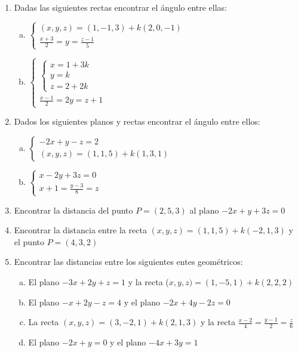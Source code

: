 \documentclass[11pt,a4paper]{article}
\begin{document}
\begin{enumerate}
\item Dadas las siguientes rectas encontrar el \'angulo entre ellas:

\begin{enumerate}[a)]
\item $\begin{cases}
  (x, y, z) = (1, -1, 3) + k (2, 0, -1) \\
  \frac{x + 3}{2} = y = \frac{z - 1}{5} 
\end{cases}$
\item $\begin{cases}
 \begin{cases}
  x = 1 + 3k \\
  y = k \\
  z = 2 + 2k
 \end{cases} \\
  \frac{x - 1}{2} = 2y = z + 1 
\end{cases}$
\end{enumerate}

\item Dados los siguientes planos y rectas encontrar el \'angulo entre ellos:

\begin{enumerate}[a)]
\item $\begin{cases}
  -2x + y - z = 2 \\
  (x, y, z) = (1, 1, 5) + k (1, 3, 1)
\end{cases}$  
\item $\begin{cases}
  x - 2y + 3z = 0 \\
  x + 1 = \frac{y - 3}{8} = z
\end{cases}$
\end{enumerate}

\item Encontrar la distancia del punto $P = (2, 5, 3)$ al plano \linebreak $-2x + y + 3z = 0$

\item Encontrar la distancia entre la recta $(x, y, z) = (1, 1, 5) + k (-2, 1, 3)$ y el punto $P = (4, 3, 2)$

\item Encontrar las distancias entre los siguientes entes geom\'etricos:

\begin{enumerate}[a)]
\item El plano $-3x + 2y + z = 1$ y la recta ($x, y, z) = (1, -5, 1) + k (2, 2, 2)$
\item El plano $-x + 2y - z = 4$ y el plano $-2x + 4y - 2z = 0$
\item La recta $(x, y, z) = (3, -2, 1) + k (2, 1, 3)$ y la recta \linebreak $\frac{x - 2}{4} = \frac{y - 1}{2} = \frac{z}{6}$
\item El plano $-2x + y = 0$ y el plano $-4x + 3y = 1$
\end{enumerate}


\end{enumerate}
\end{document}
